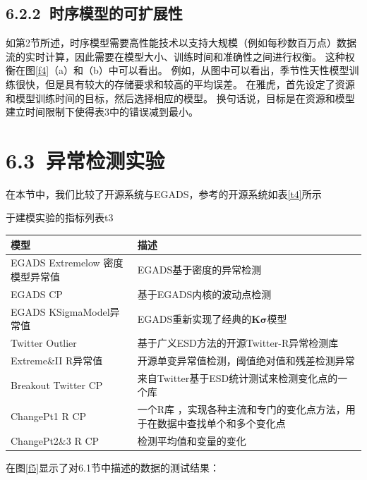 \documentclass[a4paper,AutoFakeBold,oneside,12pt]{book}
\begin{document}

\subsection*{6.2.2\ 时序模型的可扩展性}
如第2节所述，时序模型需要高性能技术以支持大规模（例如每秒数百万点）数据流的实时计算，因此需要在模型大小、训练时间和准确性之间进行权衡。 这种权衡在图\ref{f4}（a）和（b）中可以看出。 例如，从图中可以看出，季节性天性模型训练很快，但是具有较大的存储要求和较高的平均误差。 在雅虎，首先设定了资源和模型训练时间的目标，然后选择相应的模型。 换句话说，目标是在资源和模型建立时间限制下使得表3中的错误减到最小。


\section*{6.3\ 异常检测实验}
在本节中，我们比较了开源系统与EGADS，参考的开源系统如表\ref{t4}所示

\begin{bupttable}{于建模实验的指标列表}{t3}
    \begin{tabular}{l|l}
		\hline \textbf{模型} & \textbf{描述} \\
		\hline EGADS Extremelow 密度模型异常值 & EGADS基于密度的异常检测 \\
		\hline EGADS CP & 基于EGADS内核的波动点检测  \\
		\hline EGADS KSigmaModel异常值 & EGADS重新实现了经典的$\bm{K\sigma}$模型  \\
		\hline Twitter Outlier & 基于广义ESD方法的开源Twitter-R异常检测库\\
		\hline Extreme\&II R异常值 & 开源单变异常值检测，阈值绝对值和残差检测异常  \\
		\hline Breakout Twitter CP & 来自Twitter基于ESD统计测试来检测变化点的一个库  \\
		\hline ChangePt1 R CP & 一个R库 ，实现各种主流和专门的变化点方法，用于在数据中查找单个和多个变化点 \\
		\hline ChangePt2\&3 R CP & 检测平均值和变量的变化  \\
		\hline
    \end{tabular}
\end{bupttable}

在图\ref{f5}显示了对6.1节中描述的数据的测试结果：

\end{document}
